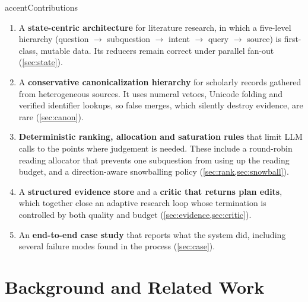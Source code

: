 \documentclass[10pt,a4paper]{article}
\begin{document}
\begin{callout}{accent}{Contributions}
\begin{enumerate}[leftmargin=*]
  \item A \textbf{state-centric architecture} for literature research, in
    which a five-level hierarchy (question $\to$ subquestion $\to$ intent
    $\to$ query $\to$ source) is first-class, mutable data. Its reducers
    remain correct under parallel fan-out (\cref{sec:state}).
  \item A \textbf{conservative canonicalization hierarchy} for scholarly
    records gathered from heterogeneous sources. It uses numeral vetoes,
    Unicode folding and verified identifier lookups, so false merges, which
    silently destroy evidence, are rare (\cref{sec:canon}).
  \item \textbf{Deterministic ranking, allocation and saturation rules} that
    limit LLM calls to the points where judgement is needed. These include a
    round-robin reading allocator that prevents one subquestion from using
    up the reading budget, and a direction-aware snowballing policy
    (\cref{sec:rank,sec:snowball}).
  \item A \textbf{structured evidence store} and a \textbf{critic that
    returns plan edits}, which together close an adaptive research loop
    whose termination is controlled by both quality and budget
    (\cref{sec:evidence,sec:critic}).
  \item An \textbf{end-to-end case study} that reports what the system did,
    including several failure modes found in the process
    (\cref{sec:case}).
\end{enumerate}
\end{callout}

\section{Background and Related Work}
\label{sec:related}
\end{document}
